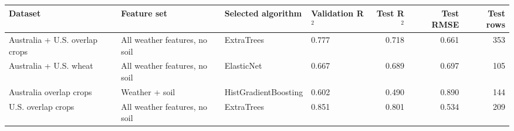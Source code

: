 \begin{tabular}{llllrrr}
\toprule
Dataset & Feature set & Selected algorithm & Validation R$^2$ & Test R$^2$ & Test RMSE & Test rows \\
\midrule
Australia + U.S. overlap crops & All weather features, no soil & ExtraTrees & 0.777 & 0.718 & 0.661 & 353 \\
Australia + U.S. wheat & All weather features, no soil & ElasticNet & 0.667 & 0.689 & 0.697 & 105 \\
Australia overlap crops & Weather + soil & HistGradientBoosting & 0.602 & 0.490 & 0.890 & 144 \\
U.S. overlap crops & All weather features, no soil & ExtraTrees & 0.851 & 0.801 & 0.534 & 209 \\
\bottomrule
\end{tabular}
